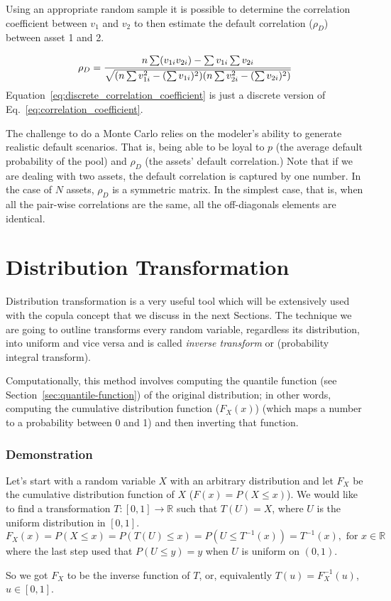 Using an appropriate random sample it is possible to determine the correlation coefficient between $v_1$ and $v_2$ to then estimate the default correlation ($\rho_D$) between asset 1 and 2.

\begin{equation}
\rho_D = \cfrac{n\sum (v_{1i} v_{2i}) - \sum v_{1i} \sum v_{2i}}{\sqrt{(n\sum v_{1i}^2 - (\sum v_{1i})^2)(n\sum v_{2i}^2 - (\sum v_{2i})^2)}}
\label{eq:discrete_correlation_coefficient}
\end{equation}
Equation~\ref{eq:discrete_correlation_coefficient} is just a discrete version of Eq.~\ref{eq:correlation_coefficient}.

The challenge to do a Monte Carlo relies on the modeler’s ability to generate realistic default scenarios. That is, being able to be loyal to $p$ (the average default probability of the pool) and $\rho_D$ (the assets’ default correlation.) Note that if we are dealing with two assets, the default correlation is captured by one number. In the case of $N$ assets, $\rho_D$ is a symmetric matrix. In the simplest case, that is, when all the pair-wise correlations are the same, all the off-diagonals elements are identical. 

\section{Distribution Transformation}
\label{distribution-transformation}

Distribution transformation is a very useful tool which will be extensively used with the copula concept that we discuss in the next Sections. The technique we are going to outline transforms every random variable, regardless its distribution, into uniform and vice versa and is called \emph{inverse transform} or (probability integral transform).

Computationally, this method involves computing the quantile function (see Section~\ref{sec:quantile-function}) of the original distribution; in other words, computing the cumulative distribution function ($F_X(x)$) (which maps a number to a probability between 0 and 1) and then inverting that function. 

\begin{attention}
\subsubsection{Demonstration}
Let's start with a random variable $X$ with an arbitrary distribution and let $F_X$ be the cumulative distribution function of $X$ (\(F(x) = P(X \leq x)\)). 
We would like to find a transformation $T:[0,1]\rightarrow\mathbb{R}$ such that $T(U)=X$, where $U$ is the uniform distribution in $[0,1]$. 
\begin{equation*}
F_{X}(x)= P(X\leq x)=P(T(U)\leq x)= P(U\leq T^{-1}(x))=T^{-1}(x),{\text{ for }}x\in \mathbb {R}
\end{equation*}
where the last step used that $P(U\leq y)=y$ when $U$ is uniform on $(0,1)$.

So we got $F_{X}$ to be the inverse function of $T$, or, equivalently $T(u)=F_{X}^{-1}(u)$, $u\in [0,1]$.
\end{attention}

